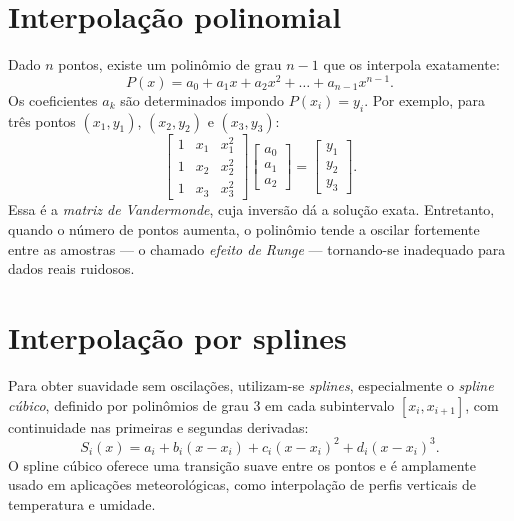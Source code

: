 \section{Interpolação polinomial}
Dado $n$ pontos, existe um polinômio de grau $n-1$ que os interpola exatamente:
\begin{equation}
P(x) = a_0 + a_1x + a_2x^2 + \dots + a_{n-1}x^{n-1}.
\label{eq:poly}
\end{equation}
Os coeficientes $a_k$ são determinados impondo $P(x_i)=y_i$.  
Por exemplo, para três pontos $(x_1,y_1)$, $(x_2,y_2)$ e $(x_3,y_3)$:
\begin{equation}
\begin{bmatrix}
1 & x_1 & x_1^2 \\
1 & x_2 & x_2^2 \\
1 & x_3 & x_3^2
\end{bmatrix}
\begin{bmatrix}
a_0 \\ a_1 \\ a_2
\end{bmatrix}
=
\begin{bmatrix}
y_1 \\ y_2 \\ y_3
\end{bmatrix}.
\label{eq:vandermonde}
\end{equation}
Essa é a \emph{matriz de Vandermonde}, cuja inversão dá a solução exata.  
Entretanto, quando o número de pontos aumenta, o polinômio tende a oscilar fortemente entre as amostras — o chamado \emph{efeito de Runge} — tornando-se inadequado para dados reais ruidosos.

\section{Interpolação por splines}
Para obter suavidade sem oscilações, utilizam-se \emph{splines}, especialmente o \emph{spline cúbico}, definido por polinômios de grau 3 em cada subintervalo $[x_i, x_{i+1}]$, com continuidade nas primeiras e segundas derivadas:
\[
S_i(x) = a_i + b_i(x-x_i) + c_i(x-x_i)^2 + d_i(x-x_i)^3.
\]
O spline cúbico oferece uma transição suave entre os pontos e é amplamente usado em aplicações meteorológicas, como interpolação de perfis verticais de temperatura e umidade.

